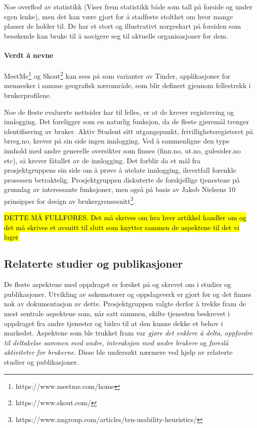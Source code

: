 Noe overflod av statistikk (Viser frem statistikk både som tall på forside og under egen lenke), men det kan være gjort for å stadfeste stolthet om hvor mange plasser de holder til. De har et stort og illustrativt norgeskart på forsiden som besøkende kan bruke til å navigere seg til aktuelle organisasjoner for dem.



\paragraph{Verdt å nevne} MeetMe\footnote{https://www.meetme.com/home} og Skout\footnote{https://www.skout.com/} kan sees på som varianter av Tinder, applikasjoner for mennesker i samme geografisk nærområde, som blir definert gjennom fellestrekk i brukerprofilene.



Noe de fleste evaluerte nettsider har til felles, er at de krever registrering og innlogging. Det foreligger som en naturlig funksjon, da de fleste gjøremål trenger identifisering av bruker. Aktiv Student sitt utgangspunkt, frivillighetsregisteret på brreg.no, krever på sin side ingen innlogging. Ved å sammenligne den type innhold med andre generelle oversikter som finnes (finn.no, ut.no, gulesider.no etc), så krever fåtallet av de innlogging. Det forblir da et mål fra prosjektgruppens sin side om å prøve å utelate innlogging, ihvertfall forenkle prosessen betraktelig. Prosjektgruppen diskuterte de forskjellige tjenestene på grunnlag av interessante funksjoner, men også på basis av Jakob Nielsens 10 prinsipper for design av brukergrensesnitt\footnote{https://www.nngroup.com/articles/ten-usability-heuristics/}.


\hl{DETTE MÅ FULLFØRES. Det må skrives om hva hver artikkel handler om og det må skrives et avsnitt til slutt som knytter sammen de aspektene til det vi lager}

\subsection{Relaterte studier og publikasjoner}
De fleste aspektene med oppdraget er forsket på og skrevet om i studier og publikasjoner. Utvikling av søkemotorer og oppslagsverk er gjort før og det finnes nok av dokumentasjon av dette. Prosjektgruppen valgte derfor å trekke fram de mest sentrale aspektene som, når satt sammen, skilte tjenesten beskrevet i oppdraget fra andre tjenester og bidro til at den kunne dekke et behov i markedet. Aspektene som ble trukket fram var {\em gjøre det enklere å delta}, {\em oppfordre til deltakelse sammen med andre}, {\em interaksjon med andre brukere} og {\em foreslå aktiviteter for brukerne}. Disse ble undersøkt nærmere ved hjelp av relaterte studier og publikasjoner.

